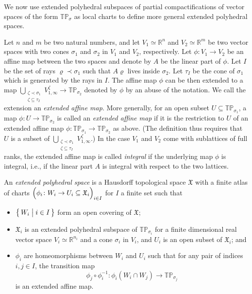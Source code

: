 \documentclass[11pt]{amsart}
\theoremstyle{definition}
\numberwithin{equation}{section}
\renewcommand{\~}{\widetilde}
\newcommand{\R}{\mathbb{R}}
\newcommand{\TP}{\mathbb{TP}} %
\newcommand{\st}{\bigm|} %
\newcommand{\X}{\mathfrak X}
\newcommand{\subface}{\prec}
\begin{document}
\medskip

We now use extended polyhedral subspaces of partial compactifications of vector spaces of the form $\TP_\sigma$ as local charts to define more general extended polyhedral spaces.

Let $n$ and $m$ be two natural numbers, and let $V_1\simeq \R^n$ and $V_2\simeq \R^m$ be two vector spaces with two cones $\sigma_1$ and $\sigma_2$ in $V_1$ and $V_2$, respectively. Let $\phi\colon V_1 \to V_2$ be an affine map between the two spaces and denote by $A$ be the linear part of $\phi$. Let $I$ be the set of rays $\varrho\subface\sigma_1$ such that $A\varrho$ lives inside $\sigma_2$. Let $\tau_I$ be the cone of $\sigma_1$ which is generated by the rays in $I$. The affine map $\phi$ can be then extended to a map $\bigcup_{\substack{\zeta \subface \sigma_1 \\ \zeta \subseteq \tau_I}} V^\zeta_{1,\infty} \to \TP_{\sigma_2}$ denoted by $\phi$ by an abuse of the notation. We call the extension an \emph{extended affine map}. More generally, for an open subset $U \subseteq \TP_{\sigma_1}$, a map $\phi \colon U \to \TP_{\sigma_2}$ is called an \emph{extended affine map} if it is the restriction to $U$ of an extended affine map $\phi\colon \TP_{\sigma_1} \to \TP_{\sigma_2}$ as above. (The definition thus requires that $U$ is a subset of $\bigcup_{\substack{\zeta \subface \sigma_1 \\ \zeta \subseteq \tau_I}} V^\zeta_{1,\infty}$.) In the case $V_1$ and $V_2$ come with sublattices of full ranks, the extended affine map is called \emph{integral} if the underlying map $\phi$ is integral, i.e., if the linear part $A$ is integral with respect to the two lattices.

\medskip

An \emph{extended polyhedral space} is a Hausdorff topological space $\X$ with a finite atlas of charts $\Bigl(\phi_i\colon W_i \to U_i \subseteq \X_i\Bigr)_{i\in I}$ for $I$ a finite set such that

\begin{itemize}
\item $\bigl\{\,W_i \st {i\in I}\, \bigr\}$ form an open covering of $\X$;
\item $\X_i$ is an extended polyhedral subspace of $\TP_{\sigma_i}$ for a finite dimensional real vector space $V_i\simeq\R^{n_i}$ and a cone $\sigma_i$ in $V_i$, and $U_i$ is an open subset of $\X_i$; and
\item $\phi_i$ are homeomorphisms between $W_i$ and $U_i$ such that for any pair of indices $i,j\in I$, the transition map
\[\phi_j\circ \phi_i^{-1} \colon \phi_i(W_i \cap W_j) \to \TP_{\sigma_j}\]
is an extended affine map.
\end{itemize}
\end{document}
